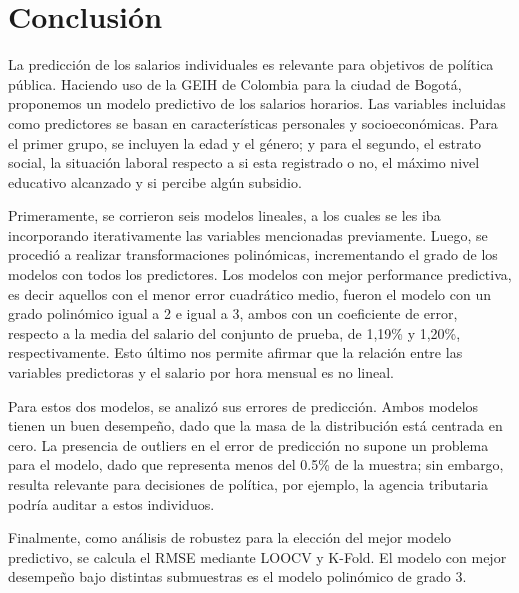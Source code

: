 \documentclass[11pt,oneside]{article}
\begin{document}
\newpage

\section{Conclusión}

La predicción de los salarios individuales es relevante para objetivos de política pública. Haciendo uso de la GEIH de Colombia para la ciudad de Bogotá, proponemos un modelo predictivo de los salarios horarios. Las variables incluidas como predictores se basan en características personales y socioeconómicas. Para el primer grupo, se incluyen la edad y el género; y para el segundo, el estrato social, la situación laboral respecto a si esta registrado o no, el máximo nivel educativo alcanzado y si percibe algún subsidio. 

Primeramente, se corrieron seis modelos lineales, a los cuales se les iba incorporando iterativamente las variables mencionadas previamente. Luego, se procedió a realizar transformaciones polinómicas, incrementando el grado de los modelos con todos los predictores. Los modelos con mejor performance predictiva, es decir aquellos con el menor error cuadrático medio, fueron el modelo con un grado polinómico igual a 2 e igual a 3, ambos con un coeficiente de error, respecto a la media del salario del conjunto de prueba, de 1,19\% y 1,20\%, respectivamente. Esto último nos permite afirmar que la relación entre las variables predictoras y el salario por hora mensual es no lineal. 

Para estos dos modelos, se analizó sus errores de predicción. Ambos modelos tienen un buen desempeño, dado que la masa de la distribución está centrada en cero. La presencia de outliers en el error de predicción no supone un problema para el modelo, dado que representa menos del 0.5\% de la muestra; sin embargo, resulta relevante para decisiones de política, por ejemplo, la agencia tributaria podría auditar a estos individuos.

Finalmente, como análisis de robustez para la elección del mejor modelo predictivo, se calcula el RMSE mediante LOOCV y K-Fold. El modelo con mejor desempeño bajo distintas submuestras es el modelo polinómico de grado 3. 


	\newpage
	
	
	
\end{document}
